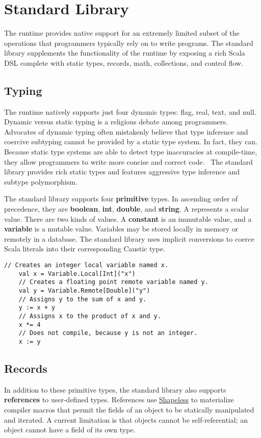 \documentclass[../main.tex]{subfiles}
\begin{document}
\section{Standard Library}
The runtime provides native support for an extremely limited subset of the operations that
programmers typically rely on to write programs. The standard library supplements the
functionality of the runtime by exposing a rich Scala DSL complete with static types, records,
math, collections, and control flow.

  \subsection{Typing}
  The runtime natively supports just four dynamic types: flag, real, text, and null.
  Dynamic versus static typing is a religious debate among programmers. Advocates of dynamic
  typing often mistakenly believe that type inference and coercive subtyping cannot be provided by
  a static type system. In fact, they can. Because static type systems are able to
  detect type inaccuracies at compile-time, they allow programmers to write more concise and
  correct code.~\cite{typing} The standard library provides rich static types and features
  aggressive type inference and subtype polymorphism.

  The standard library supports four \textbf{primitive} types. In ascending order of precedence,
  they are \textbf{boolean}, \textbf{int}, \textbf{double}, and \textbf{string}. A 
  represents a scalar value. There are two kinds of values. A \textbf{constant} is an immutable
  value, and a \textbf{variable} is a mutable value. Variables may be stored locally in memory or
  remotely in a database. The standard library uses implicit conversions to coerce Scala literals
  into their corresponding Caustic type.

  \begin{lstlisting}[style=Scala]
    // Creates an integer local variable named x.
    val x = Variable.Local[Int]("x")
    // Creates a floating point remote variable named y.
    val y = Variable.Remote[Double]("y")
    // Assigns y to the sum of x and y.
    y := x + y
    // Assigns x to the product of x and y.
    x *= 4
    // Does not compile, because y is not an integer.
    x := y
  \end{lstlisting}

  \subsection{Records}
  In addition to these primitive types, the standard library also supports \textbf{references} to
  user-defined types. References use \href{https://github.com/milessabin/shapeless}{Shapeless} to
  materialize compiler macros that permit the fields of an object to be statically manipulated and
  iterated. A current limitation is that objects cannot be self-referential; an object cannot have a
  field of its own type.
\end{document}
